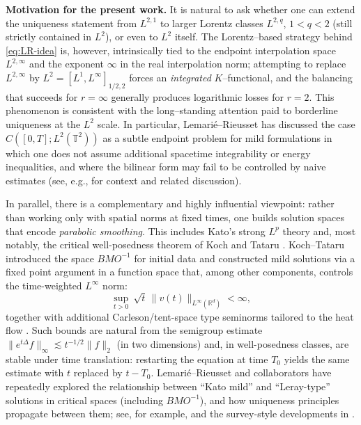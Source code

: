 \documentclass[12pt]{article}
\newcommand{\R}{\mathbb{R}}
\newcommand{\T}{\mathbb{T}}
\theoremstyle{remark}
\theoremstyle{remark}
\begin{document}
\medskip

\noindent\textbf{Motivation for the present work.}
It is natural to ask whether one can extend the uniqueness statement from $L^{2,1}$
to larger Lorentz classes $L^{2,q}$, $1<q<2$ (still strictly contained in $L^2$), or even to
$L^2$ itself. The Lorentz--based strategy behind \eqref{eq:LR-idea} is, however, intrinsically tied
to the endpoint interpolation space $L^{2,\infty}$ and the exponent $\infty$ in the real interpolation
norm; attempting to replace $L^{2,\infty}$ by $L^2=[L^1,L^\infty]_{1/2,2}$ forces an
\emph{integrated} $K$--functional, and the balancing that succeeds for $r=\infty$ generally
produces logarithmic losses for $r=2$. This phenomenon is consistent with the long--standing
attention paid to borderline uniqueness at the $L^2$ scale. In particular, Lemari\'e--Rieusset
has discussed the case $C([0,T];L^2(\T^2))$ as a subtle endpoint problem for mild formulations
in which one does not assume additional spacetime integrability or energy inequalities, and where
the bilinear form may fail to be controlled by naive estimates (see, e.g., \cite{LemarieBook2023} for
context and related discussion).

In parallel, there is a complementary and highly influential viewpoint: rather than working
only with spatial norms at fixed times, one builds solution spaces that encode \emph{parabolic smoothing}.
This includes Kato's strong $L^p$ theory \cite{Kato1984} and, most notably, the critical well-posedness
theorem of Koch and Tataru \cite{KochTataru2001}. Koch--Tataru introduced the space $BMO^{-1}$
for initial data and constructed mild solutions via a fixed point argument in a function space that,
among other components, controls the time-weighted $L^\infty$ norm:
\begin{equation}\label{eq:KT-smoothing}
\sup_{t>0}\ \sqrt{t}\,\|v(t)\|_{L^\infty(\R^d)} < \infty,
\end{equation}
together with additional Carleson/tent-space type seminorms tailored to the heat flow
\cite{KochTataru2001}. Such bounds are natural from the semigroup estimate
$\|e^{t\Delta}f\|_\infty\lesssim t^{-1/2}\|f\|_2$ (in two dimensions) and, in well-posedness classes,
are stable under time translation: restarting the equation at time $T_0$ yields the same estimate
with $t$ replaced by $t-T_0$. Lemari\'e--Rieusset and collaborators have repeatedly explored the
relationship between ``Kato mild'' and ``Leray-type'' solutions in critical spaces (including $BMO^{-1}$),
and how uniqueness principles propagate between them; see, for example, \cite{LemariePrioux2009}
and the survey-style developments in \cite{LemarieBook2002,LemarieBook2023}.
\end{document}
